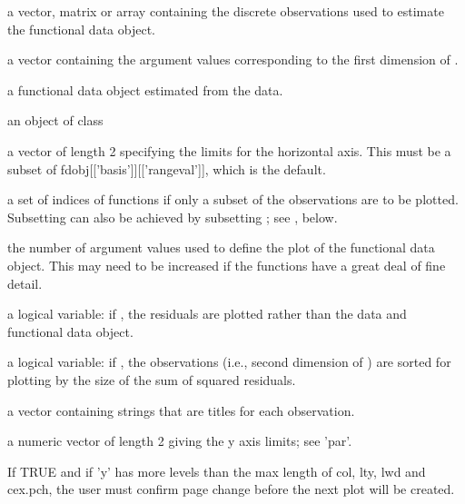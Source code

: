 \begin{Arguments}
\begin{ldescription}
\item[\code{y}] a vector, matrix or array containing the discrete observations used
to estimate the functional data object. 

\item[\code{argvals}] a vector containing the argument values corresponding to the first
dimension of . 

\item[\code{fdobj}] a functional data object estimated from the data.

\item[\code{fdSm}] an object of class  
\item[\code{rng}] a vector of length 2 specifying the limits for the horizontal axis.
This must be a subset of fdobj[['basis']][['rangeval']], which is
the default. 

\item[\code{index}] a set of indices of functions if only a subset of the observations
are to be plotted.  Subsetting can also be achieved by subsetting
;  see , below.  

\item[\code{nfine}] the number of argument values used to define the plot of the
functional data object.  This may need to be increased if the
functions have a great deal of fine detail. 

\item[\code{residual}] a logical variable:  if , the residuals are plotted
rather than the data and functional data object.

\item[\code{sortwrd}] a logical variable:  if , the observations (i.e., second
dimension of ) are sorted for plotting by the size of the
sum of squared residuals. 

\item[\code{titles}] a vector containing strings that are titles for each observation.

\item[\code{ylim}] a numeric vector of length 2 giving the y axis limits;  see 'par'.  

\item[\code{ask}] If TRUE and if 'y' has more levels than the max length of col, lty,
lwd and cex.pch, the user must confirm page change before the next
plot will be created.


\end{ldescription}
\end{Arguments}
